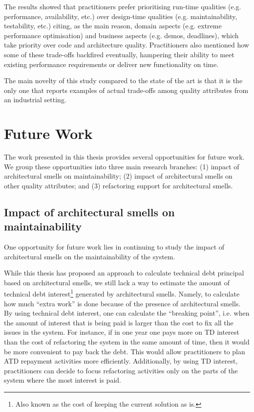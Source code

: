 The results showed that practitioners prefer prioritising run-time qualities (e.g. performance, availability, etc.) over design-time qualities (e.g. maintainability, testability, etc.) citing, as the main reason, domain aspects (e.g. extreme performance optimisation) and business aspects (e.g. demos, deadlines), which take priority over code and architecture quality.
Practitioners also mentioned how some of these trade-offs backfired eventually, hampering their ability to meet existing performance requirements or deliver new functionality on time. 

The main novelty of this study compared to the state of the art is that it is the only one that reports examples of actual trade-offs among quality attributes from an industrial setting.

\section{Future Work}\label{c8:sec:future-work}
The work presented in this thesis provides several opportunities for future work.
We group these opportunities into three main research branches:
(1) impact of architectural smells on maintainability; (2) impact of architectural smells on other quality attributes; and (3) refactoring support for architectural smells.


\subsection{Impact of architectural smells on maintainability}
One opportunity for future work lies in continuing to study the impact of architectural smells on the maintainability of the system.

While this thesis has proposed an approach to calculate technical debt principal based on architectural smells, we still lack a way to estimate the amount of technical debt interest\footnote{Also known as the cost of keeping the current solution as is.} generated by architectural smells.
Namely, to calculate how much ``extra work'' is done because of the presence of architectural smells.
By using technical debt interest, one can calculate the ``breaking point'', i.e. when the amount of interest that is being paid is larger than the cost to fix all the issues in the system.
For instance, if in one year one pays more on TD interest than the cost of refactoring the system in the same amount of time, then it would be more convenient to pay back the debt.
This would allow practitioners to plan ATD repayment activities more efficiently.
Additionally, by using TD interest, practitioners can decide to focus refactoring activities only on the parts of the system where the most interest is paid.

